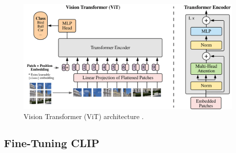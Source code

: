 \begin{figure}[h!]
\centering
\includegraphics[width=0.7\linewidth]{modeling/visionTransformer.png}  
\caption{Vision Transformer (ViT) architecture \citep{ViT}.}
\label{modeling.visionTransformer}
\end{figure}


\subsection{Fine-Tuning CLIP} \label{clip.finetune}
